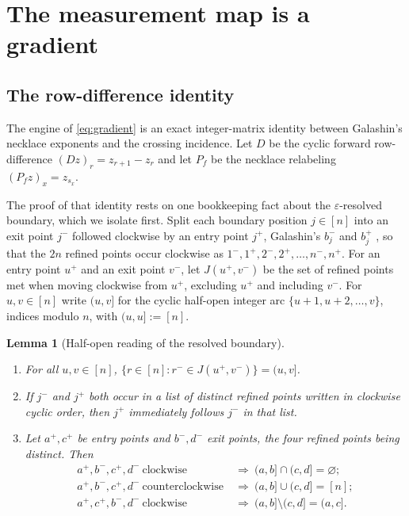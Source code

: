 \documentclass[11pt]{article}
\newtheorem{lemma}[theorem]{Lemma}
\theoremstyle{definition}
\begin{document}
\section{The measurement map is a gradient}\label{sec:gradient}

\subsection{The row-difference identity}
The engine of \eqref{eq:gradient} is an exact integer-matrix identity between Galashin's necklace exponents
and the crossing incidence. Let $D$ be the cyclic forward row-difference $(Dz)_r=z_{r+1}-z_r$ and let
$P_f$ be the necklace relabeling $(P_fz)_x=z_{s_x}$.

The proof of that identity rests on one bookkeeping fact about the $\varepsilon$-resolved boundary,
which we isolate first. Split each boundary position $j\in[n]$ into an exit point $j^-$ followed clockwise by an entry
point $j^+$, Galashin's $b^-_j$ and $b^+_j$ \cite[Def.~1.5]{Galashin}, so that the $2n$ refined points
occur clockwise as $1^-,1^+,2^-,2^+,\dots,n^-,n^+$. For an entry point $u^+$ and an exit point $v^-$,
let $J(u^+,v^-)$ be the set of refined points met when moving clockwise from $u^+$, excluding $u^+$
and including $v^-$. For $u,v\in[n]$ write $(u,v]$ for the cyclic half-open integer arc
$\{u+1,u+2,\dots,v\}$, indices modulo $n$, with $(u,u]:=[n]$.

\begin{lemma}[Half-open reading of the resolved boundary]\label{lem:halfopen}
\leavevmode
\begin{enumerate}
\item[\textup{(a)}] For all $u,v\in[n]$, $\{r\in[n]:r^-\in J(u^+,v^-)\}=(u,v]$.
\item[\textup{(b)}] If $j^-$ and $j^+$ both occur in a list of distinct refined points written in
clockwise cyclic order, then $j^+$ immediately follows $j^-$ in that list.
\item[\textup{(c)}] Let $a^+,c^+$ be entry points and $b^-,d^-$ exit points, the four refined points
being distinct. Then
\begin{align}
   a^+,b^-,c^+,d^-\ \text{clockwise} &\ \Longrightarrow\ (a,b]\cap(c,d]=\varnothing;\label{eq:L1}\\
   a^+,b^-,c^+,d^-\ \text{counterclockwise} &\ \Longrightarrow\ (a,b]\cup(c,d]=[n];\label{eq:L2}\\
   a^+,c^+,b^-,d^-\ \text{clockwise} &\ \Longrightarrow\ (a,b]\setminus(c,d]=(a,c].\label{eq:L3}
\end{align}
\end{enumerate}
\end{lemma}
\end{document}
